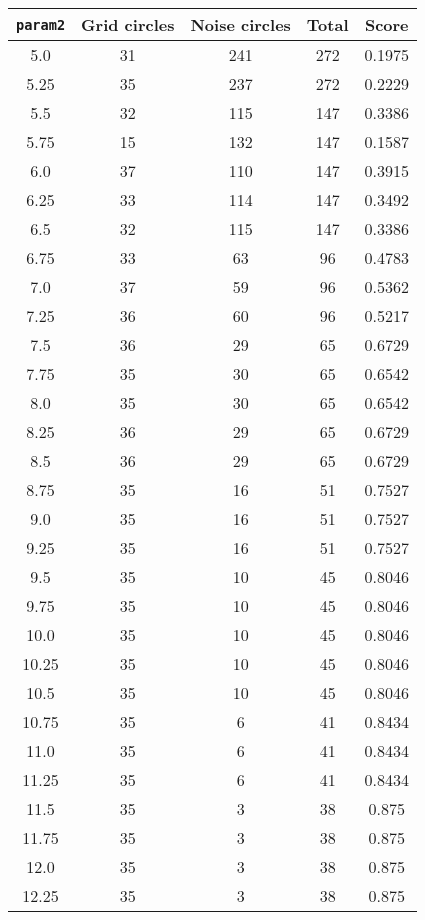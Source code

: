 \documentclass[letterpaper, 12pt]{article}
\begin{document}
\begin{longtable}{|c|c|c|c|c|}
\hline
\textbf{\texttt{param2}} & \textbf{Grid circles} & \textbf{Noise circles} & \textbf{Total} & \textbf{Score} \\
\hline
5.0 & 31 & 241 & 272 & 0.1975 \\
\hline
5.25 & 35 & 237 & 272 & 0.2229 \\
\hline
5.5 & 32 & 115 & 147 & 0.3386 \\
\hline
5.75 & 15 & 132 & 147 & 0.1587 \\
\hline
6.0 & 37 & 110 & 147 & 0.3915 \\
\hline
6.25 & 33 & 114 & 147 & 0.3492 \\
\hline
6.5 & 32 & 115 & 147 & 0.3386 \\
\hline
6.75 & 33 & 63 & 96 & 0.4783 \\
\hline
7.0 & 37 & 59 & 96 & 0.5362 \\
\hline
7.25 & 36 & 60 & 96 & 0.5217 \\
\hline
7.5 & 36 & 29 & 65 & 0.6729 \\
\hline
7.75 & 35 & 30 & 65 & 0.6542 \\
\hline
8.0 & 35 & 30 & 65 & 0.6542 \\
\hline
8.25 & 36 & 29 & 65 & 0.6729 \\
\hline
8.5 & 36 & 29 & 65 & 0.6729 \\
\hline
8.75 & 35 & 16 & 51 & 0.7527 \\
\hline
9.0 & 35 & 16 & 51 & 0.7527 \\
\hline
9.25 & 35 & 16 & 51 & 0.7527 \\
\hline
9.5 & 35 & 10 & 45 & 0.8046 \\
\hline
9.75 & 35 & 10 & 45 & 0.8046 \\
\hline
10.0 & 35 & 10 & 45 & 0.8046 \\
\hline
10.25 & 35 & 10 & 45 & 0.8046 \\
\hline
10.5 & 35 & 10 & 45 & 0.8046 \\
\hline
10.75 & 35 & 6 & 41 & 0.8434 \\
\hline
11.0 & 35 & 6 & 41 & 0.8434 \\
\hline
11.25 & 35 & 6 & 41 & 0.8434 \\
\hline
11.5 & 35 & 3 & 38 & 0.875 \\
\hline
11.75 & 35 & 3 & 38 & 0.875 \\
\hline
12.0 & 35 & 3 & 38 & 0.875 \\
\hline
12.25 & 35 & 3 & 38 & 0.875 \\
\hline

\end{longtable}
\end{document}
